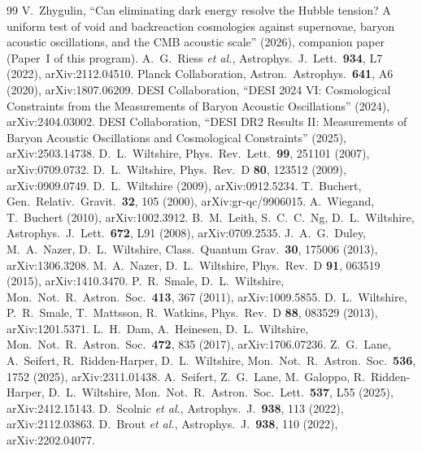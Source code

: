 \documentclass[aps,prd,twocolumn,nofootinbib,superscriptaddress,floatfix]{revtex4-2}
\begin{document}
\begin{thebibliography}{99}
 V.~Zhygulin, ``Can eliminating dark energy resolve the Hubble tension? A uniform test of void and backreaction cosmologies against supernovae, baryon acoustic oscillations, and the CMB acoustic scale'' (2026), companion paper (Paper~I of this program).
 A.~G.~Riess \emph{et al.}, Astrophys.\ J.\ Lett.\ \textbf{934}, L7 (2022), arXiv:2112.04510.
 Planck Collaboration, Astron.\ Astrophys.\ \textbf{641}, A6 (2020), arXiv:1807.06209.
 DESI Collaboration, ``DESI 2024 VI: Cosmological Constraints from the Measurements of Baryon Acoustic Oscillations'' (2024), arXiv:2404.03002.
 DESI Collaboration, ``DESI DR2 Results II: Measurements of Baryon Acoustic Oscillations and Cosmological Constraints'' (2025), arXiv:2503.14738.
 D.~L.~Wiltshire, Phys.\ Rev.\ Lett.\ \textbf{99}, 251101 (2007), arXiv:0709.0732.
 D.~L.~Wiltshire, Phys.\ Rev.\ D \textbf{80}, 123512 (2009), arXiv:0909.0749.
 D.~L.~Wiltshire (2009), arXiv:0912.5234.
 T.~Buchert, Gen.\ Relativ.\ Gravit.\ \textbf{32}, 105 (2000), arXiv:gr-qc/9906015.
 A.~Wiegand, T.~Buchert (2010), arXiv:1002.3912.
 B.~M.~Leith, S.~C.~C.~Ng, D.~L.~Wiltshire, Astrophys.\ J.\ Lett.\ \textbf{672}, L91 (2008), arXiv:0709.2535.
 J.~A.~G.~Duley, M.~A.~Nazer, D.~L.~Wiltshire, Class.\ Quantum Grav.\ \textbf{30}, 175006 (2013), arXiv:1306.3208.
 M.~A.~Nazer, D.~L.~Wiltshire, Phys.\ Rev.\ D \textbf{91}, 063519 (2015), arXiv:1410.3470.
 P.~R.~Smale, D.~L.~Wiltshire, Mon.\ Not.\ R.\ Astron.\ Soc.\ \textbf{413}, 367 (2011), arXiv:1009.5855.
 D.~L.~Wiltshire, P.~R.~Smale, T.~Mattsson, R.~Watkins, Phys.\ Rev.\ D \textbf{88}, 083529 (2013), arXiv:1201.5371.
 L.~H.~Dam, A.~Heinesen, D.~L.~Wiltshire, Mon.\ Not.\ R.\ Astron.\ Soc.\ \textbf{472}, 835 (2017), arXiv:1706.07236.
 Z.~G.~Lane, A.~Seifert, R.~Ridden-Harper, D.~L.~Wiltshire, Mon.\ Not.\ R.\ Astron.\ Soc.\ \textbf{536}, 1752 (2025), arXiv:2311.01438.
 A.~Seifert, Z.~G.~Lane, M.~Galoppo, R.~Ridden-Harper, D.~L.~Wiltshire, Mon.\ Not.\ R.\ Astron.\ Soc.\ Lett.\ \textbf{537}, L55 (2025), arXiv:2412.15143.
 D.~Scolnic \emph{et al.}, Astrophys.\ J.\ \textbf{938}, 113 (2022), arXiv:2112.03863.
 D.~Brout \emph{et al.}, Astrophys.\ J.\ \textbf{938}, 110 (2022), arXiv:2202.04077.

\end{thebibliography}
\end{document}
